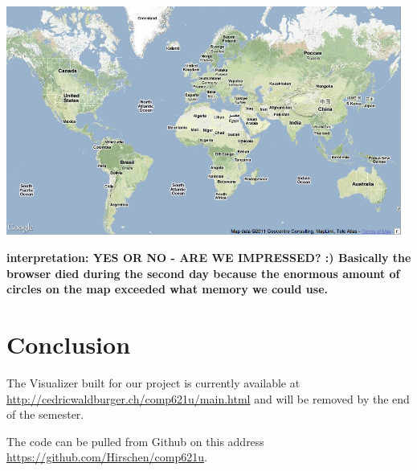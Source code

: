\documentclass[11pt,a4paper,english]{article}
\begin{document}
\begin{itemize}
						\includegraphics[width=130mm]{img/2005-1}
						
						\bf interpretation: \rm YES OR NO - ARE WE IMPRESSED? :)
						Basically the browser died during the second day because the enormous amount of circles on the map exceeded what memory we could use.
						
						
%						
%						
						
					
						
				\end{itemize}
 \newpage	
	\section{Conclusion}
		The Visualizer built for our project is currently available at \url{http://cedricwaldburger.ch/comp621u/main.html} and will be removed by the end of the semester. 

		The code can be pulled from Github on this address \url{https://github.com/Hirschen/comp621u}.
\end{document}
